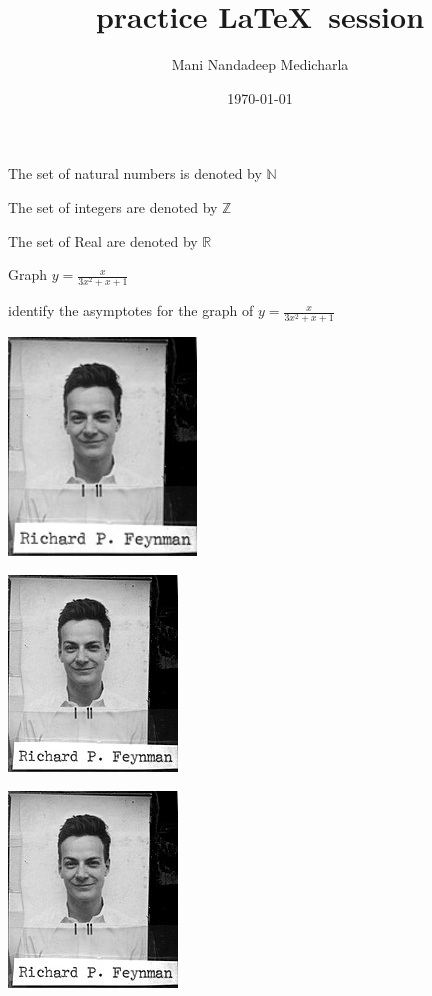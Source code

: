 \documentclass[11pt]{article}
\def\eq1{y=\frac{x}{3x^2+x+1}}
\begin{document}
\title{practice \LaTeX \ session}
\author{Mani Nandadeep Medicharla}
\date{\today}
\maketitle

The set of natural numbers is denoted by $\mathbb{N}$

The set of integers are denoted by $\mathbb{Z}$

The set of Real are denoted by $\mathbb{R}$

Graph $\eq1$

identify the asymptotes for the graph of $\eq1$

\begin{center}
\includegraphics[width=5cm]{img.jpg}
\end{center}

\begin{center}
\includegraphics[scale=0.5]{img.jpg}
\end{center}

\begin{center}
\includegraphics[angle=45]{img.jpg}
\end{center}
\end{document}
